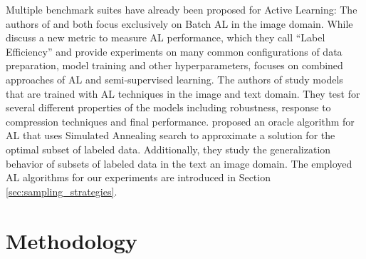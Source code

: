 \documentclass[]{article}
\begin{document}
%
Multiple benchmark suites have already been proposed for Active Learning:
The authors of \cite{beck2021effective} and \cite{li2022empirical} both focus exclusively on Batch AL in the image domain.
While \cite{beck2021effective} discuss a new metric to measure AL performance, which they call ``Label Efficiency'' and provide experiments on many common configurations of data preparation, model training and other hyperparameters, \cite{li2022empirical} focuses on combined approaches of AL and semi-supervised learning.
The authors of \cite{hu2021towards} study models that are trained with AL techniques in the image and text domain.
They test for several different properties of the models including robustness, response to compression techniques and final performance.
\cite{zhou2021towards} proposed an oracle algorithm for AL that uses Simulated Annealing search to approximate a solution for the optimal subset of labeled data.
Additionally, they study the generalization behavior of subsets of labeled data in the text an image domain.
The employed AL algorithms for our experiments are introduced in Section \ref{sec:sampling_strategies}.


\section{Methodology}

\end{document}
